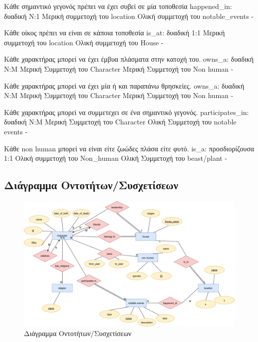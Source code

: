 \documentclass[../main.tex]{subfiles}
\begin{document}
{Κάθε σημαντικό γεγονός πρέπει να έχει συβεί σε μία τοποθεσία}
{happened\_in: δυαδική}
{Ν:1}
{Μερική συμμετοχή του location \newline Ολική συμμετοχή του notable\_events}
{-}

{Κάθε οίκος πρέπει να είναι σε κάποια τοποθεσία}
{is\_at: δυαδική}
{1:1}
{Μερική συμμετοχή του location \newline Ολική συμμετοχή του House}
{-}

{Κάθε χαρακτήρας μπορεί να έχει έμβυα πλάσματα στην κατοχή του. }
{owns\_a: δυαδική}
{N:M}
{Μερική Συμμετοχή του Character \newline Μερική Συμμετοχή του Non human}
{-}

{Κάθε χαρακτήρας μπορεί να έχει μία ή και παραπάνω θρησκείες.}
{owns\_a: δυαδική}
{N:M}
{Μερική Συμμετοχή του Character \newline Μερική Συμμετοχή του Non human}
{-}

{Κάθε χαρακτήρας μπορεί να συμμετεχει σε ένα σημαντικό γεγονός.}
{participates\_in: δυαδική}
{N:M}
{Μερική Συμμετοχή του Character \newline Ολική Συμμετοχή του notable events}
{-}

{Κάθε non human μπορεί να είναι είτε ζωώδες πλάσα είτε φυτό.}
{is\_a: προσδιορίζουσα }
{1:1}
{Ολική συμμετοχή του Non\_human \newline Ολική Συμμετοχή του beast/plant }
{-}

\subsection{Διάγραμμα Οντοτήτων/Συσχετίσεων}

\begin{figure}[H]
	\includegraphics[width=\textwidth]{../images/entity_relation_diagram.png}
	\caption{Διάγραμμα Οντοτήτων/Συσχετίσεων}
\end{figure}
\end{document}
